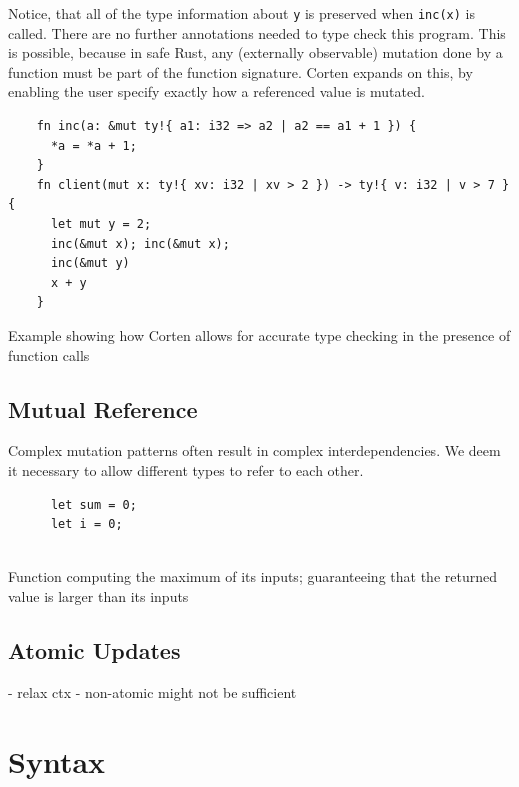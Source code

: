 \documentclass{book}
\newcommand{\code}[1]{\texttt{#1}}
\theoremstyle{definition}
\begin{document}
Notice, that all of the type information about \code{y} is preserved when \code{inc(x)} is called. There are no further annotations needed to type check this program. This is possible, because in safe Rust, any (externally observable) mutation done by a function must be part of the function signature. Corten expands on this, by enabling the user specify exactly how a referenced value is mutated.

\begin{listing}[h]
  \begin{verbatim}
    fn inc(a: &mut ty!{ a1: i32 => a2 | a2 == a1 + 1 }) {
      *a = *a + 1;
    }
    fn client(mut x: ty!{ xv: i32 | xv > 2 }) -> ty!{ v: i32 | v > 7 } {
      let mut y = 2;
      inc(&mut x); inc(&mut x);
      inc(&mut y)
      x + y
    }
  \end{verbatim}
  \caption{Example showing how Corten allows for accurate type checking in the presence of function calls }
  \label{lst:modular-calls}
\end{listing}



\label{subsec:mutual-reference}\subsection{Mutual Reference}

Complex mutation patterns often result in complex interdependencies. We deem it necessary to allow different types to refer to each other.

\begin{listing}[h]
  \begin{verbatim}
      let sum = 0;
      let i = 0;
      
  \end{verbatim}
  \caption{Function computing the maximum of its inputs; guaranteeing that the returned value is larger than its inputs}
  \label{lst:mutual-reference}
\end{listing}

\label{subsec:atomic-updates}\subsection{Atomic Updates}

- relax ctx
- non-atomic might not be sufficient


\section{Syntax}
\end{document}
